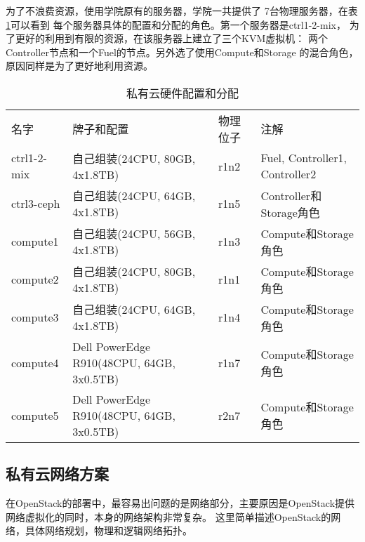 为了不浪费资源，使用学院原有的服务器，学院一共提供了
7台物理服务器，在表\ref{tab:hardware-table}可以看到
每个服务器具体的配置和分配的角色。第一个服务器是ctrl1-2-mix，
为了更好的利用到有限的资源，在该服务器上建立了三个KVM虚拟机：
两个Controller节点和一个Fuel的节点。另外选了使用Compute和Storage
的混合角色，原因同样是为了更好地利用资源。
\begin{table}[H]
  \centering
  \begin{minipage}[t]{0.98\linewidth} %
  \caption[私有云硬件配置和分配]{私有云硬件配置和分配}
  \label{tab:hardware-table}
    \begin{tabularx}{\linewidth}{lXlX}
      \toprule[1.5pt]
        名字 & 牌子和配置 &  物理位子 & 注解\\
        ctrl1-2-mix & 自己组装\newline(24CPU, 80GB, 4x1.8TB) & r1n2 & Fuel, Controller1, Controller2  \\
        ctrl3-ceph & 自己组装\newline(24CPU, 64GB, 4x1.8TB) & r1n5 & Controller和Storage角色  \\
        compute1 & 自己组装\newline(24CPU, 56GB, 4x1.8TB) & r1n3 & Compute和Storage角色  \\
        compute2 & 自己组装\newline(24CPU, 80GB, 4x1.8TB) & r1n1 & Compute和Storage角色  \\
        compute3 & 自己组装\newline(24CPU, 64GB, 4x1.8TB) & r1n4 & Compute和Storage角色  \\
        compute4 & Dell PowerEdge R910\newline(48CPU, 64GB, 3x0.5TB) & r1n7 & Compute和Storage角色  \\
        compute5 & Dell PowerEdge R910\newline(48CPU, 64GB, 3x0.5TB) & r2n7 & Compute和Storage角色  \\
      \bottomrule[1.5pt]
    \end{tabularx}
  \end{minipage}
\end{table}


\subsection{私有云网络方案}
在OpenStack的部署中，最容易出问题的是网络部分，主要原因是OpenStack提供网络虚拟化的同时，本身的网络架构非常复杂。
这里简单描述OpenStack的网络，具体网络规划，物理和逻辑网络拓扑。

